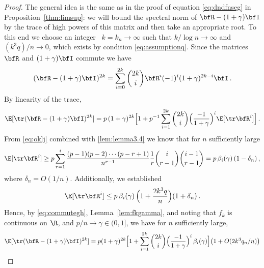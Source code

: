 \begin{proof}
The general idea is the same as in the proof of equation \eqref{eq:dndfnseg} in Proposition~\ref{thm:limsup}: we will 
bound the spectral norm of $\bfR-(1+\gamma) \bfI$ by the trace of high powers of this matrix and then take an appropriate root.
To this end we choose an integer \seq\ $k=k_n\to \infty$ such that $k/\log n \to \infty$ and $(k^3 q)/n \to 0$, which exists by condition \eqref{eq:assumptionq}. 
Since the matrices $\bfR$ and $(1+\gamma) \bfI$ commute we have
\begin{equation*}
(\bfR-(1+\gamma) \bfI)^{2k}= \sum_{i=0}^{2k} \binom{2k}{i} \bfR^i (-1)^i (1+\gamma)^{2k-i} \bfI\,.
\end{equation*}
By linearity of the trace,
\begin{equation}\label{eq:commutegh}
\E[ \tr(\bfR-(1+\gamma) \bfI)^{2k}]= p\,(1+\gamma)^{2k} \Big[1 + p^{-1} \sum_{i=1}^{2k} \binom{2k}{i}  \Big(\frac{-1}{1+\gamma}\Big)^i \E[\tr \bfR^i]\Big]\,.
\end{equation}
From \eqref{eq:oklj} combined with \eqref{lem:lemma3.4} we know that for $n$ sufficiently large
\begin{equation}\label{eq:gsegkasdf1}
\E[\tr \bfR^i]\ge p \sum_{r=1}^i \frac{(p-1)(p-2)\cdots (p-r+1)}{n^{r-1}} \frac{1}{r}\binom{i}{r-1}\binom{i-1}{r-1} =p\, \beta_i(\gamma)\,(1-\delta_n)\,,
\end{equation}
where $\delta_n=O(1/n)$. Additionally, we established
\begin{equation}\label{eq:gsegkasdf2}
\E[\tr \bfR^i]\le p\, \beta_i(\gamma)\,\Big(1+\frac{2k^3 q}{n}\Big) (1+\delta_n)\,.
\end{equation}
Hence, by \eqref{eq:commutegh}, Lemma~\ref{lem:fkgamma}, and noting that $f_k$ is continuous on $\R$, and $p/n\to \gamma\in(0,1]$, 
we have for $n$ sufficiently large,
\begin{equation*}
\begin{split}
\E[ \tr(\bfR-(1+\gamma) \bfI)^{2k}]%
& = p(1+\gamma)^{2k} \Big[ 1 +\sum_{i=1}^{2k} \binom{2k}{i}  \Big(\frac{-1}{1+\gamma}\Big)^i  \,\beta_i(\gamma)\Big]
\big(1+O(2k^3 q_n/n)\big)\\

\end{split}
\end{equation*}
\end{proof}
